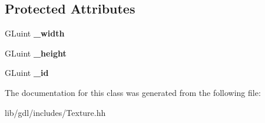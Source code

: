 \subsection*{Protected Attributes}
\begin{DoxyCompactItemize}
\item 
\hypertarget{classgdl_1_1_texture_a649311ec115dcd70df025714d52f887e}{}G\+Luint {\bfseries \+\_\+width}\label{classgdl_1_1_texture_a649311ec115dcd70df025714d52f887e}

\item 
\hypertarget{classgdl_1_1_texture_ad016a8f5410560f0ac2498eb75ba7570}{}G\+Luint {\bfseries \+\_\+height}\label{classgdl_1_1_texture_ad016a8f5410560f0ac2498eb75ba7570}

\item 
\hypertarget{classgdl_1_1_texture_ad583257567501c6c9f58b943c03cde68}{}G\+Luint {\bfseries \+\_\+id}\label{classgdl_1_1_texture_ad583257567501c6c9f58b943c03cde68}

\end{DoxyCompactItemize}


The documentation for this class was generated from the following file\+:\begin{DoxyCompactItemize}
\item 
lib/gdl/includes/Texture.\+hh\end{DoxyCompactItemize}
